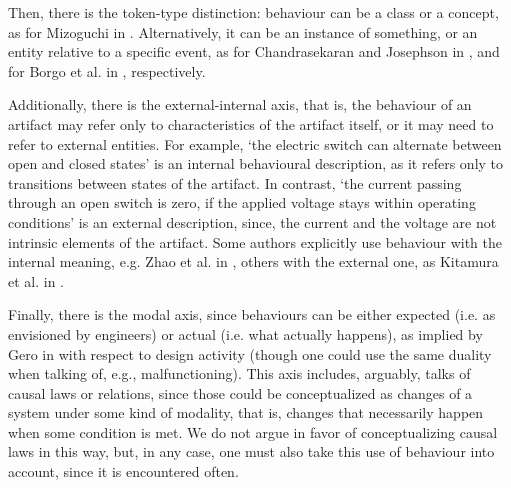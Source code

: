 \documentclass[sw]{iosart2x}
\begin{document}
Then, there is the token-type distinction: behaviour can be a class or a concept, as for  Mizoguchi in \cite{mizoguchiFunctionalOntologyArtifacts2009}. Alternatively, it can be an instance of something, or an entity relative to a specific event, as for Chandrasekaran and Josephson in \cite{chandrasekaranFunctionDeviceRepresentation2000}, and for Borgo et al. in \cite{borgoFormalOntologicalPerspective2009}, respectively. 

Additionally, there is the external-internal axis, that is, the behaviour of an artifact may refer only to characteristics of the artifact itself, or it may need to refer to  external entities.
For example, `the electric switch can alternate between open and closed states' is an internal behavioural description, as it refers only to transitions between states of the artifact.
In contrast, `the current passing through an open switch is zero, if the applied voltage stays within operating conditions' is an external description, since, the current and the voltage are not intrinsic elements of the artifact. Some authors explicitly use behaviour with the internal meaning, e.g. Zhao et al. in \cite{zhaoStateBehaviorFunction2019}, others with the external one, as Kitamura et al. in \cite{kitamuraOntologybasedSystematizationFunctional2004}.

Finally, there is the modal axis, since behaviours can be either expected (i.e. as envisioned by engineers) or actual (i.e. what actually happens), as implied by Gero in \cite{geroSituatedFunctionBehaviour2004} with respect to design activity (though one could use the same duality when talking of, e.g., malfunctioning).
This axis includes, arguably, talks of causal laws or relations, since those could be conceptualized as changes of a system under some kind of 
modality, that is, changes that necessarily happen when some condition is met.
We do not argue in favor of conceptualizing causal laws in this way, but, in any case, one must also take this use of behaviour into account, since it is encountered often. 
\end{document}
